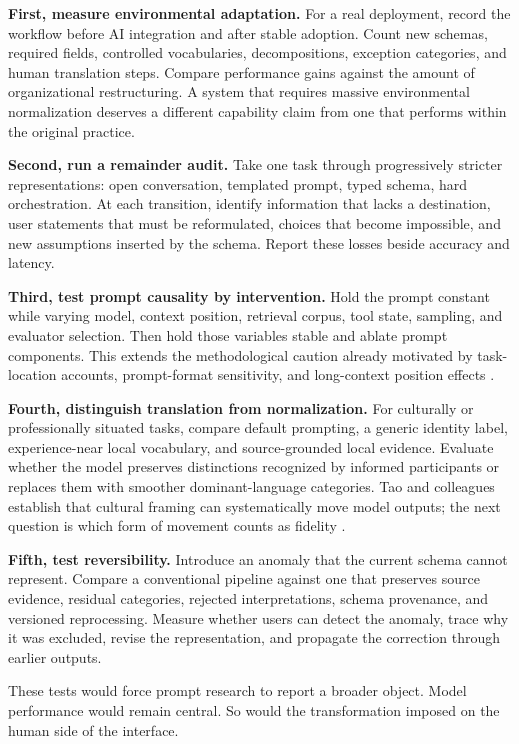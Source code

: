 \documentclass[11pt]{article}
\begin{document}
\textbf{First, measure environmental adaptation.} For a real deployment, record the workflow before AI integration and after stable adoption. Count new schemas, required fields, controlled vocabularies, decompositions, exception categories, and human translation steps. Compare performance gains against the amount of organizational restructuring. A system that requires massive environmental normalization deserves a different capability claim from one that performs within the original practice.

\textbf{Second, run a remainder audit.} Take one task through progressively stricter representations: open conversation, templated prompt, typed schema, hard orchestration. At each transition, identify information that lacks a destination, user statements that must be reformulated, choices that become impossible, and new assumptions inserted by the schema. Report these losses beside accuracy and latency.

\textbf{Third, test prompt causality by intervention.} Hold the prompt constant while varying model, context position, retrieval corpus, tool state, sampling, and evaluator selection. Then hold those variables stable and ablate prompt components. This extends the methodological caution already motivated by task-location accounts, prompt-format sensitivity, and long-context position effects \citep{reynolds2021prompt,sclar2024format,liu2024lost}.

\textbf{Fourth, distinguish translation from normalization.} For culturally or professionally situated tasks, compare default prompting, a generic identity label, experience-near local vocabulary, and source-grounded local evidence. Evaluate whether the model preserves distinctions recognized by informed participants or replaces them with smoother dominant-language categories. Tao and colleagues establish that cultural framing can systematically move model outputs; the next question is which form of movement counts as fidelity \citep{tao2024cultural}.

\textbf{Fifth, test reversibility.} Introduce an anomaly that the current schema cannot represent. Compare a conventional pipeline against one that preserves source evidence, residual categories, rejected interpretations, schema provenance, and versioned reprocessing. Measure whether users can detect the anomaly, trace why it was excluded, revise the representation, and propagate the correction through earlier outputs.

These tests would force prompt research to report a broader object. Model performance would remain central. So would the transformation imposed on the human side of the interface.
\end{document}
